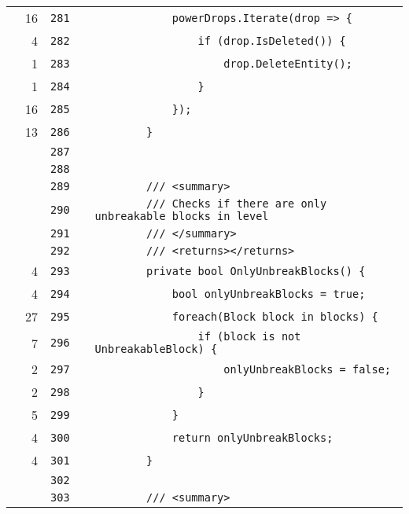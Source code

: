 \documentclass[a4paper,landscape,10pt]{article}
\begin{document}
\begin{longtable}[l]{lrrll}
\cellcolor{green} & 16 & \verb~281~ & & \verb~            powerDrops.Iterate(drop => {~\\
\cellcolor{green} & 4 & \verb~282~ & & \verb~                if (drop.IsDeleted()) {~\\
\cellcolor{green} & 1 & \verb~283~ & & \verb~                    drop.DeleteEntity();~\\
\cellcolor{green} & 1 & \verb~284~ & & \verb~                }~\\
\cellcolor{green} & 16 & \verb~285~ & & \verb~            });~\\
\cellcolor{green} & 13 & \verb~286~ & & \verb~        }~\\
\cellcolor{gray} &  & \verb~287~ & & \verb~~\\
\cellcolor{gray} &  & \verb~288~ & & \verb~~\\
\cellcolor{gray} &  & \verb~289~ & & \verb~        /// <summary>~\\
\cellcolor{gray} &  & \verb~290~ & & \verb~        /// Checks if there are only unbreakable blocks in level~\\
\cellcolor{gray} &  & \verb~291~ & & \verb~        /// </summary>~\\
\cellcolor{gray} &  & \verb~292~ & & \verb~        /// <returns></returns>~\\
\cellcolor{green} & 4 & \verb~293~ & & \verb~        private bool OnlyUnbreakBlocks() {~\\
\cellcolor{green} & 4 & \verb~294~ & & \verb~            bool onlyUnbreakBlocks = true;~\\
\cellcolor{green} & 27 & \verb~295~ & & \verb~            foreach(Block block in blocks) {~\\
\cellcolor{green} & 7 & \verb~296~ & & \verb~                if (block is not UnbreakableBlock) {~\\
\cellcolor{green} & 2 & \verb~297~ & & \verb~                    onlyUnbreakBlocks = false;~\\
\cellcolor{green} & 2 & \verb~298~ & & \verb~                }~\\
\cellcolor{green} & 5 & \verb~299~ & & \verb~            }~\\
\cellcolor{green} & 4 & \verb~300~ & & \verb~            return onlyUnbreakBlocks;~\\
\cellcolor{green} & 4 & \verb~301~ & & \verb~        }~\\
\cellcolor{gray} &  & \verb~302~ & & \verb~~\\
\cellcolor{gray} &  & \verb~303~ & & \verb~        /// <summary>~\\

\end{longtable}
\end{document}
